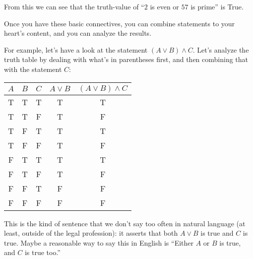 \documentclass[11pt,dvipsnames]{book}
\numberwithin{figure}{section} %
\numberwithin{table}{section} %
\begin{document}
\begin{example}
From this we can see that the truth-value of ``$2$ is even or $57$ is prime'' is True.
\end{example}

\bigskip

\noindent Once you have these basic connectives, you can combine statements to your heart's content, and you can analyze the results.
\begin{example}
For example, let's have a look at the statement $(A \vee B) \wedge C$.
Let's analyze the truth table by dealing with what's in parentheses first, and then combining that with the statement $C$:
\begin{center}
    \begin{tabular}{c|c|c|c|c}
        $A$ & $B$ & $C$ & $A \vee B$ & $(A \vee B) \wedge C$ \\ \hline 
        T & T & T & T & T\\
        T & T & F & T & F\\
        T & F & T & T & T\\
        T & F & F & T & F\\
        F & T & T & T & T\\
        F & T & F & T & F\\
        F & F & T & F & F\\
        F & F & F & F & F\\
    \end{tabular}
\end{center}

This is the kind of sentence that we don't say too often in natural language (at least, outside of the legal profession): it asserts that both $A \vee B$ is true and $C$ is true.
Maybe a reasonable way to say this in English is ``Either $A$ or $B$ is true, and $C$ is true too.''
\end{example}
\end{document}
